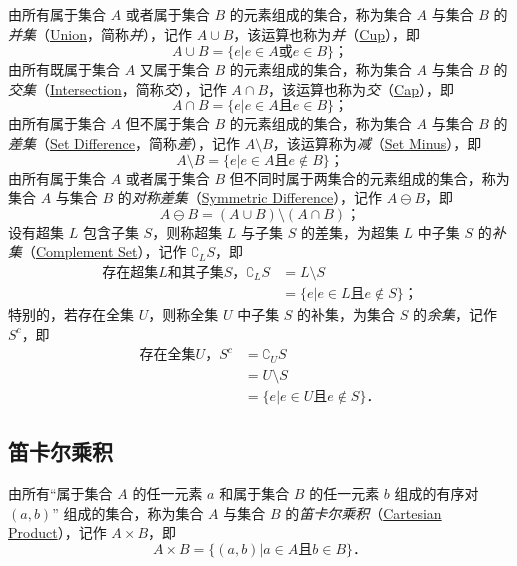 由所有属于集合 $A$ 或者属于集合 $B$ 的元素组成的集合，称为集合 $A$ 与集合 $B$ 的\emph{并集}（\href{http://mathworld.wolfram.com/Union.html}{Union}，简称\emph{并}），记作 $A\cup{}B$，该运算也称为\emph{并}（\href{http://mathworld.wolfram.com/Cup.html}{Cup}），即
\[
A \cup B = \{ e | e \in A \text{或} e \in B \} \text{；}
\]
由所有既属于集合 $A$ 又属于集合 $B$ 的元素组成的集合，称为集合 $A$ 与集合 $B$ 的\emph{交集}（\href{http://mathworld.wolfram.com/Intersection.html}{Intersection}，简称\emph{交}），记作 $A\cap{}B$，该运算也称为\emph{交}（\href{http://mathworld.wolfram.com/Cap.html}{Cap}），即
\[
A \cap B = \{ e | e \in A \text{且} e \in B \} \text{；}
\]
由所有属于集合 $A$ 但不属于集合 $B$ 的元素组成的集合，称为集合 $A$ 与集合 $B$ 的\emph{差集}（\href{http://mathworld.wolfram.com/SetDifference.html}{Set Difference}，简称\emph{差}），记作 $A\setminus{}B$，该运算称为\emph{减}（\href{http://mathworld.wolfram.com/SetMinus.html}{Set Minus}），即
\[
A \setminus B = \{ e | e \in A \text{且} e \not\in B \} \text{；}
\]
由所有属于集合 $A$ 或者属于集合 $B$ 但不同时属于两集合的元素组成的集合，称为集合 $A$ 与集合 $B$ 的\emph{对称差集}（\href{http://mathworld.wolfram.com/SymmetricDifference.html}{Symmetric Difference}），记作 $A\ominus{}B$，即
\[
A \ominus B = (A \cup B) \setminus (A \cap B) \text{；}
\]
设有超集 $L$ 包含子集 $S$，则称超集 $L$ 与子集 $S$ 的差集，为超集 $L$ 中子集 $S$ 的\emph{补集}（\href{http://mathworld.wolfram.com/ComplementSet.html}{Complement Set}），记作 $\complement_LS$，即
\[
\begin{aligned}
\text{存在超集$L$和其子集$S$，} \complement_LS & = L \setminus S \\
& = \{ e | e \in L \text{且} e \not\in S \} \text{；}
\end{aligned}
\]
特别的，若存在全集 $U$，则称全集 $U$ 中子集 $S$ 的补集，为集合 $S$ 的\emph{余集}，记作 $S^c$，即
\[
\begin{aligned}
\text{存在全集$U$，} S^c &= \complement_US \\
&= U \setminus S \\
&= \{ e | e \in U \text{且} e \not\in S \} \text{．}
\end{aligned}
\]

\subsection{笛卡尔乘积}

由所有``属于集合 $A$ 的任一元素 $a$ 和属于集合 $B$ 的任一元素 $b$ 组成的有序对 $(a, b)$'' 组成的集合，称为集合 $A$ 与集合 $B$ 的\emph{笛卡尔乘积}（\href{http://mathworld.wolfram.com/CartesianProduct.html}{Cartesian Product}），记作 $A\times{}B$，即
\[
A \times B = \{ (a, b) | a \in A \text{且} b \in B \} \text{．}
\]

